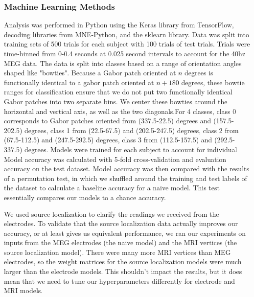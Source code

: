 \documentclass[../main.tex]{subfiles}
\begin{document}
\subsubsection{Machine Learning Methods}
Analysis was performed in Python using the Keras library from TensorFlow, decoding libraries from MNE-Python, and the sklearn library. Data was split into training sets of 500 trials for each subject with 100 trials of test trials. Trials were time-binned from 0-0.4 seconds at 0.025 second intervals to account for the 40hz MEG data. The data is split into classes based on a range of orientation angles shaped like "bowties".
Because a Gabor patch oriented at $n$ degrees is functionally identical to a gabor patch oriented at $n + 180$ degrees, these bowtie ranges for classification ensure that we do not put two functionally identical Gabor patches into two separate bins. We center these bowties around the horizontal and vertical axis, as well as the two diagonals.For 4 classes, class 0 corresponds to Gabor patches oriented from (337.5-22.5) degrees and (157.5-202.5) degrees, class 1 from (22.5-67.5) and (202.5-247.5) degrees, class 2 from (67.5-112.5) and (247.5-292.5) degrees, class 3 from (112.5-157.5) and (292.5-337.5) degrees. Models were trained for each subject to account for individual Model accuracy was calculated with 5-fold cross-validation and evaluation accuracy on the test dataset. Model accuracy was then compared with the results of a permutation test, in which we shuffled around the training and test labels of the dataset to calculate a baseline accuracy for a naive model. This test essentially compares our models to a chance accuracy.

We used source localization to clarify the readings we received from the electrodes. To validate that the source localization data actually improves our accuracy, or at least gives us equivalent performance, we ran our experiments on inputs from the MEG electrodes (the naive model) and the MRI vertices (the source localization model). There were many more MRI vertices than MEG electrodes, so the weight matrices for the source localization models were much larger than the electrode models. This shouldn't impact the results, but it does mean that we need to tune our hyperparameters differently for electrode and MRI models.
\end{document}
